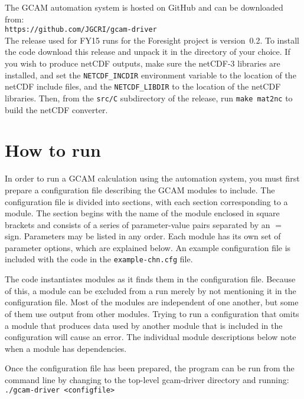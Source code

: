 \documentclass[11pt]{article}
\begin{document}
The GCAM automation system is hosted on GitHub and can be downloaded
from:\\
\texttt{https://github.com/JGCRI/gcam-driver}\\
The release used for FY15 runs for the Foresight project is
version~0.2.  To install the code download this release and unpack it
in the directory of your choice.  If you wish to produce netCDF
outputs, make sure the netCDF-3 libraries are installed, and set the
\texttt{NETCDF\_INCDIR} environment variable to the location of the
netCDF include files, and the \texttt{NETCDF\_LIBDIR} to the location
of the netCDF libraries.  Then, from the \texttt{src/C} subdirectory
of the release, run \texttt{make mat2nc} to build the netCDF
converter.

\section{How to run}

In order to run a GCAM calculation using the automation system, you
must first prepare a configuration file describing the GCAM modules to
include.  The configuration file is divided into sections, with each
section corresponding to a module.  The section begins with the name
of the module enclosed in square brackets and consists of a series of
parameter-value pairs separated by an $=$ sign.  Parameters may be
listed in any order.  Each module has its own set of parameter
options, which are explained below.  An example configuration file is
included with the code in the \texttt{example-chn.cfg} file.

The code instantiates modules as it finds them in the configuration
file.  Because of this, a module can be excluded from a run merely by
not mentioning it in the configuration file.  Most of the modules are
independent of one another, but some of them use output from other
modules.  Trying to run a configuration that omits a module that
produces data used by another module that is included in the
configuration will cause an error.  The individual module descriptions
below note when a module has dependencies.

Once the configuration file has been prepared, the program can be run
from the command line by changing to the
top-level gcam-driver directory and running:\\
\texttt{./gcam-driver <configfile>}\\
\end{document}
